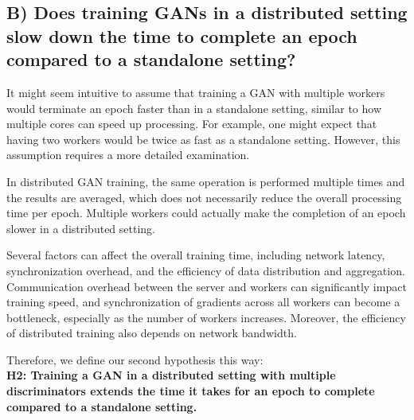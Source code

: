 \subsection*{B) Does training GANs in a distributed setting slow down the time to complete an epoch compared to a standalone setting?} \label{que:b}

It might seem intuitive to assume that training a GAN with multiple workers would terminate an epoch faster than in a standalone setting, similar to how multiple cores can speed up processing. For example, one might expect that having two workers would be twice as fast as a standalone setting. However, this assumption requires a more detailed examination.

In distributed GAN training, the same operation is performed multiple times and the results are averaged, which does not necessarily reduce the overall processing time per epoch. Multiple workers could actually make the completion of an epoch slower in a distributed setting.

Several factors can affect the overall training time, including network latency, synchronization overhead, and the efficiency of data distribution and aggregation. Communication overhead between the server and workers can significantly impact training speed, and synchronization of gradients across all workers can become a bottleneck, especially as the number of workers increases. Moreover, the efficiency of distributed training also depends on network bandwidth.

Therefore, we define our second hypothesis this way:\\
\textbf{H2: Training a GAN in a distributed setting with multiple discriminators extends the time it takes for an epoch to complete compared to a standalone setting.}



